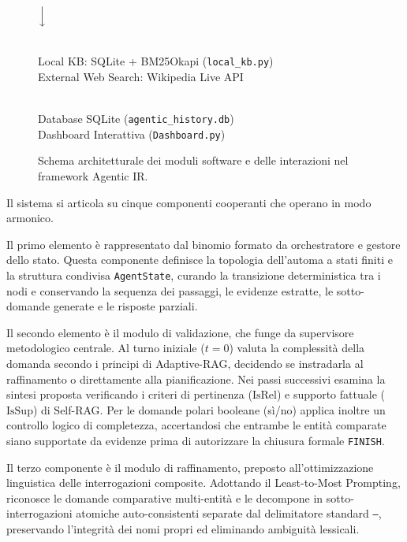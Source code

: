 \begin{figure}[htbp]
{\begin{minipage}{0.94\textwidth}
$\Big\downarrow$ \\[0.15cm]
\begin{minipage}{0.45\textwidth}
\centering
{}\\[0.1cm]
\footnotesize
Local KB: SQLite + BM25Okapi (\texttt{local\_kb.py})\\
External Web Search: Wikipedia Live API
\end{minipage}
\hfill
\begin{minipage}{0.45\textwidth}
\centering
{}\\[0.1cm]
\footnotesize
Database SQLite (\texttt{agentic\_history.db})\\
Dashboard Interattiva (\texttt{Dashboard.py})
\end{minipage}
\vspace{0.3cm}
\end{minipage}
}
\caption{Schema architetturale dei moduli software e delle interazioni nel framework Agentic IR.}
\label{fig:architettura_software}
\end{figure}

Il sistema si articola su cinque componenti cooperanti che operano in modo armonico.

Il primo elemento è rappresentato dal binomio formato da orchestratore e gestore dello stato. Questa componente definisce la topologia dell'automa a stati finiti e la struttura condivisa \texttt{AgentState}, curando la transizione deterministica tra i nodi e conservando la sequenza dei passaggi, le evidenze estratte, le sotto-domande generate e le risposte parziali.

Il secondo elemento è il modulo di validazione, che funge da supervisore metodologico centrale. Al turno iniziale ($t=0$) valuta la complessità della domanda secondo i principi di Adaptive-RAG, decidendo se instradarla al raffinamento o direttamente alla pianificazione. Nei passi successivi esamina la sintesi proposta verificando i criteri di pertinenza ($\text{IsRel}$) e supporto fattuale ($\text{IsSup}$) di Self-RAG. Per le domande polari booleane (sì/no) applica inoltre un controllo logico di completezza, accertandosi che entrambe le entità comparate siano supportate da evidenze prima di autorizzare la chiusura formale \texttt{FINISH}.

Il terzo componente è il modulo di raffinamento, preposto all'ottimizzazione linguistica delle interrogazioni composite. Adottando il Least-to-Most Prompting, riconosce le domande comparative multi-entità e le decompone in sotto-interrogazioni atomiche auto-consistenti separate dal delimitatore standard \texttt{---}, preservando l'integrità dei nomi propri ed eliminando ambiguità lessicali.

